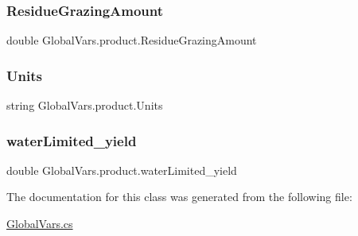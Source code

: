 \subsubsection{\texorpdfstring{ResidueGrazingAmount}{ResidueGrazingAmount}}
{\footnotesize\ttfamily double Global\+Vars.\+product.\+Residue\+Grazing\+Amount}

\mbox{\label{class_global_vars_1_1product_ac94f9aceece53d5aabd1b050479d2b7f}} 
\subsubsection{\texorpdfstring{Units}{Units}}
{\footnotesize\ttfamily string Global\+Vars.\+product.\+Units}

\mbox{\label{class_global_vars_1_1product_a64f412746041cc314030a2297e238416}} 
\subsubsection{\texorpdfstring{waterLimited\_yield}{waterLimited\_yield}}
{\footnotesize\ttfamily double Global\+Vars.\+product.\+water\+Limited\+\_\+yield}



The documentation for this class was generated from the following file\+:\begin{DoxyCompactItemize}
\item 
\mbox{\hyperlink{_global_vars_8cs}{Global\+Vars.\+cs}}\end{DoxyCompactItemize}
